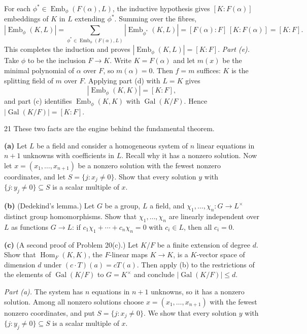 \documentclass[11pt]{article}
\begin{document}
For each $\phi^*\in\operatorname{Emb}_\phi(F(\alpha),L)$, the inductive hypothesis gives $[K:F(\alpha)]$ embeddings of $K$ in $L$ extending $\phi^*$. Summing over the fibres,
\[
|\operatorname{Emb}_\phi(K,L)|
=\sum_{\phi^*\in\operatorname{Emb}_\phi(F(\alpha),L)}|\operatorname{Emb}_{\phi^*}(K,L)|
=[F(\alpha):F]\,[K:F(\alpha)]=[K:F].
\]
This completes the induction and proves $|\operatorname{Emb}_\phi(K,L)|=[K:F]$.
\emph{Part (e).} Take $\phi$ to be the inclusion $F\to K$. Write $K=F(\alpha)$ and let $m(x)$ be the minimal polynomial of $\alpha$ over $F$, so $m(\alpha)=0$. Then $f=m$ suffices: $K$ is the splitting field of $m$ over $F$. Applying part (d) with $L=K$ gives
\[
|\operatorname{Emb}_\phi(K,K)|=[K:F],
\]
and part (c) identifies $\operatorname{Emb}_\phi(K,K)$ with $\operatorname{Gal}(K/F)$. Hence $|\operatorname{Gal}(K/F)|=[K:F]$.

\begin{problem}{21}
These two facts are the engine behind the fundamental theorem.

\textbf{(a)} Let $L$ be a field and consider a homogeneous system of $n$ linear equations in $n+1$ unknowns with coefficients in $L$. Recall why it has a nonzero solution. Now let $x=(x_1,\dots,x_{n+1})$ be a nonzero solution with the fewest nonzero coordinates, and let $S=\{j:x_j\neq0\}$. Show that every solution $y$ with $\{j:y_j\neq0\}\subseteq S$ is a scalar multiple of $x$.

\textbf{(b)} (Dedekind's lemma.) Let $G$ be a group, $L$ a field, and $\chi_1,\dots,\chi_n\colon G\to L^\times$ distinct group homomorphisms. Show that $\chi_1,\dots,\chi_n$ are linearly independent over $L$ as functions $G\to L$: if $c_1\chi_1+\cdots+c_n\chi_n=0$ with $c_i\in L$, then all $c_i=0$.

\textbf{(c)} (A second proof of Problem 20(c).) Let $K/F$ be a finite extension of degree $d$. Show that $\operatorname{Hom}_F(K,K)$, the $F$-linear maps $K\to K$, is a $K$-vector space of dimension $d$ under $(c\cdot T)(a)=cT(a)$. Then apply (b) to the restrictions of the elements of $\operatorname{Gal}(K/F)$ to $G=K^\times$ and conclude $|\operatorname{Gal}(K/F)|\le d$.
\end{problem}
\emph{Part (a).} The system has $n$ equations in $n+1$ unknowns, so it has a nonzero solution. Among all nonzero solutions choose $x=(x_1,\dots,x_{n+1})$ with the fewest nonzero coordinates, and put $S=\{j:x_j\neq0\}$. We show that every solution $y$ with $\{j:y_j\neq0\}\subseteq S$ is a scalar multiple of $x$.
\end{document}
